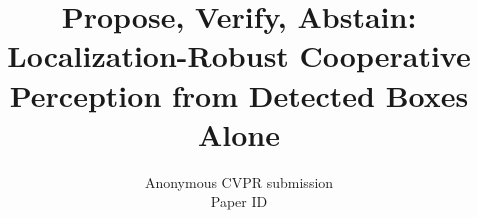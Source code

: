 \documentclass[10pt,twocolumn,letterpaper]{article}
\title{Propose, Verify, Abstain: Localization-Robust Cooperative Perception from Detected Boxes Alone}
\author{Anonymous CVPR submission\\
Paper ID \paperID
}
\begin{document}
\maketitle








{
    \small
    
    
}


\end{document}
